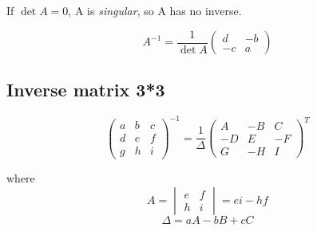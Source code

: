 \documentclass[a4paper,9pt]{scrartcl}
\begin{document}
    If $\det A = 0$, A is \textit{singular}, so A has no inverse.

    \begin{displaymath}
        A^{-1} = \frac{1}{\det A}\begin{pmatrix}
                                     d & -b \\
                                     -c & a
        \end{pmatrix}
    \end{displaymath}

    \subsection{Inverse matrix 3*3}
    \begin{displaymath}
        \begin{pmatrix}
            a & b & c \\
            d & e & f \\
            g & h & i
        \end{pmatrix}^{-1} = \frac{1}{\Delta}\begin{pmatrix}
                                                 A & -B & C \\
                                                 -D & E & -F \\
                                                 G & -H & I
        \end{pmatrix}^T
    \end{displaymath}

    where
    \begin{displaymath}
        A = \begin{vmatrix}
                e & f \\
                h & i
        \end{vmatrix} = ei-hf
    \end{displaymath}
    \begin{displaymath}
        \Delta = aA - bB + cC
    \end{displaymath}
\end{document}
